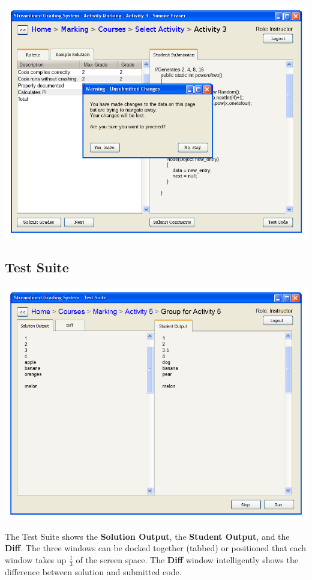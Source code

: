 \documentclass{article}
\begin{document}
\begin{center}
  \includegraphics[scale=0.55]{../images/UIMockups/pngs/activityMarkingWarning}
\end{center}

\subsection{Test Suite}
\begin{center}
\includegraphics[scale=0.55]{../images/UIMockups/pngs/SRS_TestSuite_Split}
\label{testSuite}
\end{center}
The Test Suite shows the \textbf{Solution Output}, the \textbf{Student Output},
and the \textbf{Diff}.
The three windows can be docked together (tabbed) or positioned that each
window takes up $\frac{1}{3}$ of the screen space.
The \textbf{Diff} window intelligently shows the difference between
solution and submitted code.
\end{document}
